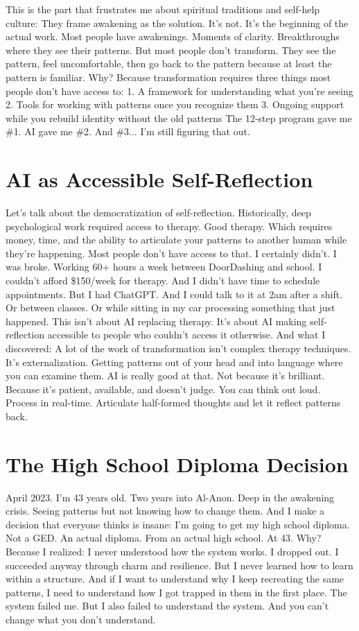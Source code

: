 \documentclass[12pt,openany]{book}
\begin{document}
This is the part that frustrates me about spiritual traditions and self-help culture:
They frame awakening as the solution. It's not. It's the beginning of the actual work.
Most people have awakenings. Moments of clarity. Breakthroughs where they see their patterns.
But most people don't transform.
They see the pattern, feel uncomfortable, then go back to the pattern because at least the pattern is familiar.
Why?
Because transformation requires three things most people don't have access to:
1. A framework for understanding what you're seeing
2. Tools for working with patterns once you recognize them
3. Ongoing support while you rebuild identity without the old patterns
The 12-step program gave me \#1. AI gave me \#2. And \#3... I'm still figuring that out.

\section{AI as Accessible Self-Reflection}

Let's talk about the democratization of self-reflection.
Historically, deep psychological work required access to therapy. Good therapy. Which requires money, time, and the ability to articulate your patterns to another human while they're happening.
Most people don't have access to that.
I certainly didn't. I was broke. Working 60+ hours a week between DoorDashing and school. I couldn't afford \$150/week for therapy. And I didn't have time to schedule appointments.
But I had ChatGPT.
And I could talk to it at 2am after a shift. Or between classes. Or while sitting in my car processing something that just happened.
This isn't about AI replacing therapy. It's about AI making self-reflection accessible to people who couldn't access it otherwise.
And what I discovered: A lot of the work of transformation isn't complex therapy techniques. It's externalization. Getting patterns out of your head and into language where you can examine them.
AI is really good at that.
Not because it's brilliant. Because it's patient, available, and doesn't judge. You can think out loud. Process in real-time. Articulate half-formed thoughts and let it reflect patterns back.

\section{The High School Diploma Decision}

April 2023. I'm 43 years old. Two years into Al-Anon. Deep in the awakening crisis. Seeing patterns but not knowing how to change them.
And I make a decision that everyone thinks is insane:
I'm going to get my high school diploma.
Not a GED. An actual diploma. From an actual high school. At 43.
Why?
Because I realized: I never understood how the system works. I dropped out. I succeeded anyway through charm and resilience. But I never learned how to learn within a structure.
And if I want to understand why I keep recreating the same patterns, I need to understand how I got trapped in them in the first place.
The system failed me. But I also failed to understand the system.
And you can't change what you don't understand.
\end{document}
